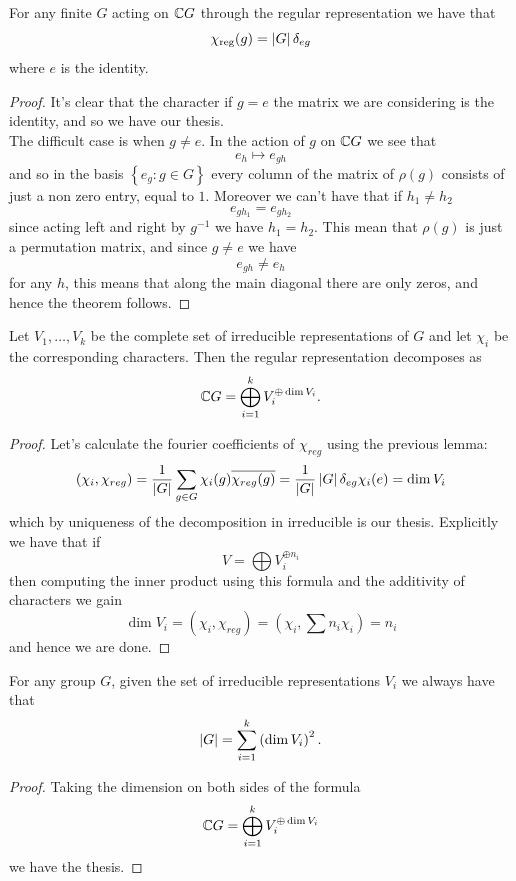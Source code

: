 \documentclass[11pt]{scrartcl}
\begin{document}
	\begin{lemma}
		For any finite $G$ acting on $\mathbb C G$ through the regular representation we have that
		$$\chi_{\text{reg}}(g)=\left\lvert G \right\rvert\delta_{e g}$$
		where $e$ is the identity.
	\end{lemma}
	\begin{proof}
		It's clear that the character if $g=e$ the matrix we are considering is the identity, and so we have our thesis. \\
		The difficult case is when $g\ne e$. In the action of $g$ on $\mathbb C G$ we see that 
		$$e_h \mapsto e_{gh}$$
		and so in the basis $\left\{e_g:g\in G\right\}$ every column of the matrix of $\rho(g)$ consists of just a non zero entry, equal to $1$. Moreover we can't have that if $h_1\ne h_2$
		$$e_{gh_1}=e_{gh_2}$$ 
		since acting left and right by $g^{-1}$ we have $h_1=h_2$. This mean that $\rho(g)$ is just a permutation matrix, and since $g\ne e$ we have
		$$e_{gh}\ne e_h$$
		for any $h$, this means that along the main diagonal there are only zeros, and hence the theorem follows. 
	\end{proof}
	\begin{theorem}
		Let $V_1, \dots, V_k$ be the complete set of irreducible representations of $G$ and let $\chi_i$ be the corresponding characters. Then the regular representation decomposes as 
		$$\mathbb C G = \bigoplus_{i=1}^k V_i^{\oplus \dim V_i}.$$
	\end{theorem}
	\begin{proof}
		Let's calculate the fourier coefficients of $\chi_{reg}$ using the previous lemma:
		$$\left(\chi_{i},\chi_{reg}\right)=\frac{1}{\left\lvert G \right\rvert}\sum_{g\in G}\chi_i(g)\overline{\chi_{reg}(g)}=\frac{1}{\left\lvert G \right\rvert}\left\lvert G \right\rvert\delta_{e g}\chi_i(e)=\dim V_i$$
		which by uniqueness of the decomposition in irreducible is our thesis. Explicitly we have that if 
		$$V=\bigoplus V_i^{\oplus n_i}$$
		then computing the inner product using this formula and the additivity of characters we gain
		$$\dim V_i=\left(\chi_i,\chi_{reg}\right)=\left(\chi_i,\sum n_i\chi_i\right)=n_i$$
		and hence we are done.
	\end{proof}
	\begin{corollary}
		For any group $G$, given the set of irreducible representations $V_i$ we always have that
		$$\left\lvert G \right\rvert=\sum_{i=1}^k \left(\dim V_i\right)^2.$$
	\end{corollary}
	\begin{proof}
		Taking the dimension on both sides of the formula 
		$$\mathbb C G = \bigoplus_{i=1}^k V_i^{\oplus \dim V_i}$$
		we have the thesis.
	\end{proof}
	
\end{document}
